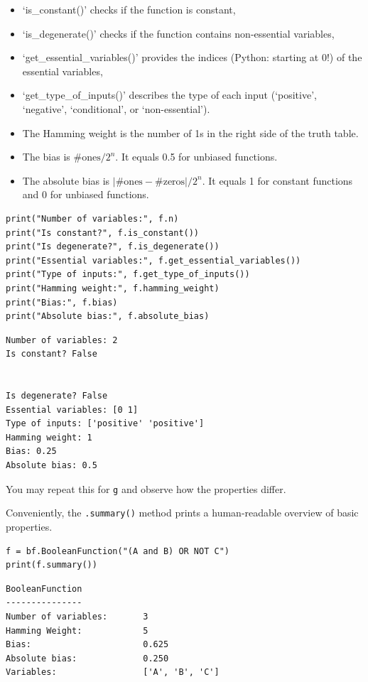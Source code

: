 \documentclass[
]{article}
\providecommand{\tightlist}{%
  \setlength{\itemsep}{0pt}\setlength{\parskip}{0pt}}
\begin{document}
\begin{itemize}
\tightlist
\item
  `is\_constant()' checks if the function is constant,
\item
  `is\_degenerate()' checks if the function contains non-essential
  variables,
\item
  `get\_essential\_variables()' provides the indices (Python: starting
  at 0!) of the essential variables,
\item
  `get\_type\_of\_inputs()' describes the type of each input
  (`positive', `negative', `conditional', or `non-essential').
\item
  The Hamming weight is the number of 1s in the right side of the truth
  table.
\item
  The bias is \(\text{\#ones} / 2^n\). It equals 0.5 for unbiased
  functions.
\item
  The absolute bias is \(|\text{\#ones} - \text{\#zeros}| / 2^n\). It
  equals 1 for constant functions and 0 for unbiased functions.
\end{itemize}

\begin{lstlisting}
print("Number of variables:", f.n)
print("Is constant?", f.is_constant())
print("Is degenerate?", f.is_degenerate())
print("Essential variables:", f.get_essential_variables())
print("Type of inputs:", f.get_type_of_inputs())
print("Hamming weight:", f.hamming_weight)
print("Bias:", f.bias)
print("Absolute bias:", f.absolute_bias)
\end{lstlisting}

\begin{lstlisting}
Number of variables: 2
Is constant? False


Is degenerate? False
Essential variables: [0 1]
Type of inputs: ['positive' 'positive']
Hamming weight: 1
Bias: 0.25
Absolute bias: 0.5
\end{lstlisting}

You may repeat this for \texttt{g} and observe how the properties
differ.

Conveniently, the \texttt{.summary()} method prints a human-readable
overview of basic properties.

\begin{lstlisting}
f = bf.BooleanFunction("(A and B) OR NOT C")
print(f.summary())
\end{lstlisting}

\begin{lstlisting}
BooleanFunction
---------------
Number of variables:       3
Hamming Weight:            5
Bias:                      0.625
Absolute bias:             0.250
Variables:                 ['A', 'B', 'C']
\end{lstlisting}
\end{document}
